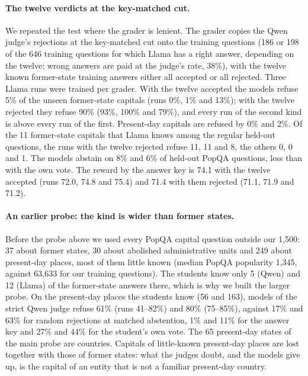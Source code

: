 \paragraph{The twelve verdicts at the key-matched cut.} We repeated the test where the grader is lenient. The grader copies the Qwen judge's rejections at the key-matched cut onto the training questions (186 or 198 of the 646 training questions for which Llama has a right answer, depending on the twelve; wrong answers are paid at the judge's rate, 38\%), with the twelve known former-state training answers either all accepted or all rejected. Three Llama runs were trained per grader. With the twelve accepted the models refuse 5\% of the unseen former-state capitals (runs 0\%, 1\% and 13\%); with the twelve rejected they refuse 90\% (93\%, 100\% and 79\%), and every run of the second kind is above every run of the first. Present-day capitals are refused by 0\% and 2\%. Of the 11 former-state capitals that Llama knows among the regular held-out questions, the runs with the twelve rejected refuse 11, 11 and 8, the others 0, 0 and 1. The models abstain on 8\% and 6\% of held-out PopQA questions, less than with the own vote. The reward by the answer key is 74.1 with the twelve accepted (runs 72.0, 74.8 and 75.4) and 71.4 with them rejected (71.1, 71.9 and 71.2).

\paragraph{An earlier probe: the kind is wider than former states.} Before the probe above we used every PopQA capital question outside our 1{,}500: 37 about former states, 30 about abolished administrative units and 249 about present-day places, most of them little known (median PopQA popularity 1{,}345, against 63{,}633 for our training questions). The students know only 5 (Qwen) and 12 (Llama) of the former-state answers there, which is why we built the larger probe. On the present-day places the students know (56 and 163), models of the strict Qwen judge refuse 61\% (runs 41--82\%) and 80\% (75--85\%), against 17\% and 63\% for random rejections at matched abstention, 1\% and 11\% for the answer key and 27\% and 44\% for the student's own vote. The 65 present-day states of the main probe are countries. Capitals of little-known present-day places are lost together with those of former states: what the judges doubt, and the models give up, is the capital of an entity that is not a familiar present-day country.

